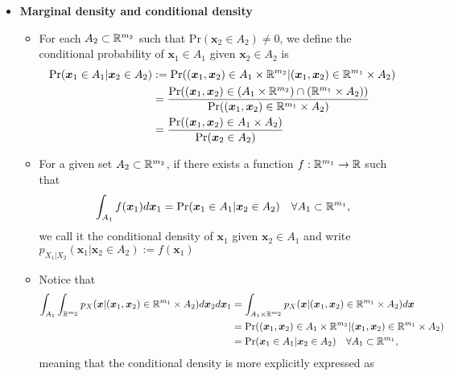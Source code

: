 \documentclass[12pt,a4paper]{article}
\begin{document}
\begin{itemize}
\item \textbf{Marginal density and conditional density}

  \begin{itemize}
  \item For each $A_{2}\subset \mathbb{R}^{m_{2}}$ such that $\text{Pr}(\bm{x}_{2}\in A_{2})\neq 0$,
    we define the conditional probability of $\bm{x}_{1}\in A_{1}$ given $\bm{x}_{2}\in A_{2}$ is
    \begin{align}
      \text{Pr}(\bm{x}_{1}\in A_{1}|\bm{x}_{2}\in A_{2})
        & := \text{Pr}((\bm{x}_{1},\bm{x}_{2})\in A_{1}\times \R^{m_{2}}|(\bm{x}_{1},\bm{x}_{2})\in \R^{m_{1}}\times A_{2}) \nonumber \\
        & = \frac{\text{Pr}((\bm{x}_{1},\bm{x}_{2})\in (A_{1}\times \R^{m_{2}})\cap (\R^{m_{1}}\times A_{2}))}{\text{Pr}((\bm{x}_{1},\bm{x}_{2})\in \R^{m_{1}}\times A_{2})}  \nonumber \\
        & = \frac{\text{Pr}((\bm{x}_{1},\bm{x}_{2})\in A_{1}\times A_{2})}{\text{Pr}(\bm{x}_{2}\in A_{2})}
    \nonumber%
    \end{align}
  \item For a given set $A_{2}\subset \mathbb{R}^{m_{2}}$,
    if there exists a function
    $f:\mathbb{R}^{m_{1}}\to \mathbb{R}$ such that
    \begin{equation}\nonumber%
      \int_{A_{1}}f(\bm{x}_{1})d\bm{x}_{1}
      =
      \text{Pr}(\bm{x}_{1}\in A_{1}|\bm{x}_{2}\in A_{2})
      \quad \forall A_{1}\subset \R^{m_{1}},
    \end{equation}
    we call it the conditional density of $\bm{x}_{1}$ given $\bm{x}_{2}\in A_{1}$
    and write $p_{X_{1}|X_{2}}(\bm{x}_{1}|\bm{x}_{2}\in A_{2}):=f(\bm{x}_{1})$
  \item Notice that
    \begin{align}
      \int_{A_{1}}\int_{\R^{m_{2}}}p_{X}(\bm{x}|(\bm{x}_{1},\bm{x}_{2})\in \R^{m_{1}}\times A_{2})d\bm{x}_{2}d\bm{x}_{1}
        & = \int_{A_{1}\times\R^{m_{2}}}p_{X}(\bm{x}|(\bm{x}_{1},\bm{x}_{2})\in \R^{m_{1}}\times A_{2})d\bm{x} \nonumber \\
        & = \text{Pr}((\bm{x}_{1},\bm{x}_{2})\in A_{1}\times \R^{m_{2}}|(\bm{x}_{1},\bm{x}_{2})\in \R^{m_{1}}\times A_{2}) \nonumber \\
        & = \text{Pr}(\bm{x}_{1}\in A_{1}|\bm{x}_{2}\in A_{2})
      \quad \forall A_{1}\subset \R^{m_{1}},
    \nonumber%
    \end{align}
    meaning that the conditional density is more explicitly expressed as
    \begin{align}

\end{align}
\end{itemize}
\end{itemize}
\end{document}
